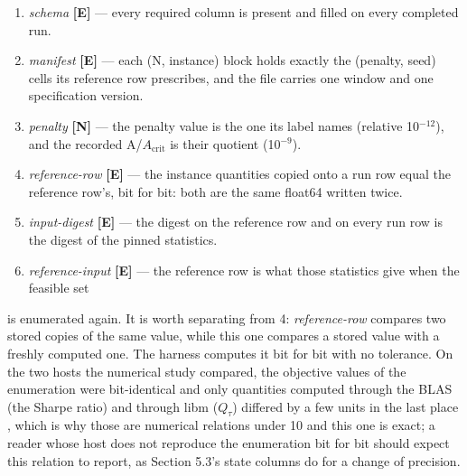 \documentclass[acmsmall,screen,review]{acmart}
\begin{document}
\begin{enumerate}
\item \textit{schema} \textbf{[E]} --- every required column is present and filled on every completed run.
\item \textit{manifest} \textbf{[E]} --- each (N, instance) block holds exactly the (penalty, seed) cells its reference row prescribes, and the file carries one window and one specification version.
\item \textit{penalty} \textbf{[N]} --- the penalty value is the one its label names (relative 10$^{-12}$), and the recorded A/$A_{\mathrm{crit}}$ is their quotient (10$^{-9}$).
\item \textit{reference-row} \textbf{[E]} --- the instance quantities copied onto a run row equal the reference row's, bit for bit: both are the same float64 written twice.
\item \textit{input-digest} \textbf{[E]} --- the digest on the reference row and on every run row is the digest of the pinned statistics.
\item \textit{reference-input} \textbf{[E]} --- the reference row is what those statistics give when the feasible set
\end{enumerate}
is enumerated again. It is worth separating from 4: \textit{reference-row} compares two stored copies of the same value, while this one compares a stored value with a freshly computed one. The harness computes it bit for bit with no tolerance. On the two hosts the numerical study compared, the objective values of the enumeration were bit-identical and only quantities computed through the BLAS (the Sharpe ratio) and through libm ($Q_{\tau}$) differed by a few units in the last place \cite{ref1}, which is why those are numerical relations under 10 and this one is exact; a reader whose host does not reproduce the enumeration bit for bit should expect this relation to report, as Section 5.3's state columns do for a change of precision.
\end{document}
